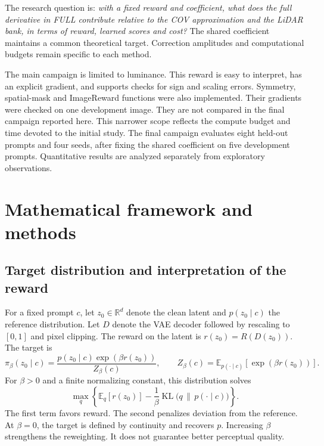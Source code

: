 \documentclass[11pt,a4paper]{article}
\newcommand{\E}{\mathbb{E}}
\newcommand{\KL}{\operatorname{KL}}
\newcommand{\R}{\mathbb{R}}
\begin{document}
The research question is: \emph{with a fixed reward and coefficient, what does the full derivative in FULL contribute relative to the COV approximation and the LiDAR bank, in terms of reward, learned scores and cost?} The shared coefficient maintains a common theoretical target. Correction amplitudes and computational budgets remain specific to each method.

The main campaign is limited to luminance. This reward is easy to interpret, has an explicit gradient, and supports checks for sign and scaling errors. Symmetry, spatial-mask and ImageReward functions were also implemented. Their gradients were checked on one development image. They are not compared in the final campaign reported here. This narrower scope reflects the compute budget and time devoted to the initial study. The final campaign evaluates eight held-out prompts and four seeds, after fixing the shared coefficient on five development prompts. Quantitative results are analyzed separately from exploratory observations.

\section{Mathematical framework and methods}
\subsection{Target distribution and interpretation of the reward}
For a fixed prompt $c$, let $z_0\in\R^d$ denote the clean latent and $p(z_0\mid c)$ the reference distribution. Let $D$ denote the VAE decoder followed by rescaling to $[0,1]$ and pixel clipping. The reward on the latent is $r(z_0)=R(D(z_0))$. The target is
\begin{equation}\label{eq:target}
\pi_\beta(z_0\mid c)=\frac{p(z_0\mid c)\exp(\beta r(z_0))}{Z_\beta(c)},
\qquad Z_\beta(c)=\E_{p(\cdot\mid c)}[\exp(\beta r(z_0))].
\end{equation}
For $\beta>0$ and a finite normalizing constant, this distribution solves
\begin{equation}\label{eq:variational}
\max_q\left\{\E_q[r(z_0)]-\frac{1}{\beta}\KL\bigl(q\,\|\,p(\cdot\mid c)\bigr)\right\}.
\end{equation}
The first term favors reward. The second penalizes deviation from the reference. At $\beta=0$, the target is defined by continuity and recovers $p$. Increasing $\beta$ strengthens the reweighting. It does not guarantee better perceptual quality.
\end{document}

